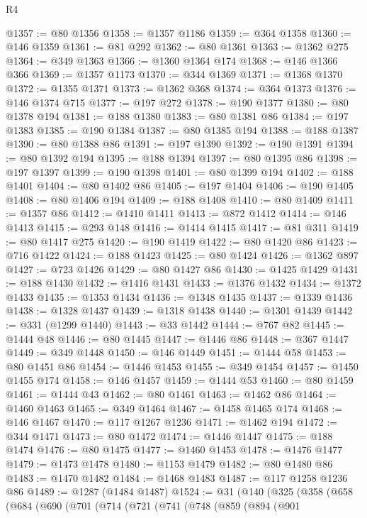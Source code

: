 \begin{lexlean}{R4}
\begin{coremodule}
@1357 := @80 @1356
@1358 := @1357 @1186
@1359 := @364 @1358
@1360 := @146 @1359
@1361 := @81 @292
@1362 := @80 @1361
@1363 := @1362 @275
@1364 := @349 @1363
@1366 := @1360 @1364 @174
@1368 := @146 @1366 @366
@1369 := @1357 @1173
@1370 := @344 @1369
@1371 := @1368 @1370
@1372 := @1355 @1371
@1373 := @1362 @368
@1374 := @364 @1373
@1376 := @146 @1374 @715
@1377 := @197 @272
@1378 := @190 @1377
@1380 := @80 @1378 @194
@1381 := @188 @1380
@1383 := @80 @1381 @86
@1384 := @197 @1383
@1385 := @190 @1384
@1387 := @80 @1385 @194
@1388 := @188 @1387
@1390 := @80 @1388 @86
@1391 := @197 @1390
@1392 := @190 @1391
@1394 := @80 @1392 @194
@1395 := @188 @1394
@1397 := @80 @1395 @86
@1398 := @197 @1397
@1399 := @190 @1398
@1401 := @80 @1399 @194
@1402 := @188 @1401
@1404 := @80 @1402 @86
@1405 := @197 @1404
@1406 := @190 @1405
@1408 := @80 @1406 @194
@1409 := @188 @1408
@1410 := @80 @1409
@1411 := @1357 @86
@1412 := @1410 @1411
@1413 := @872 @1412
@1414 := @146 @1413
@1415 := @293 @148
@1416 := @1414 @1415
@1417 := @81 @311
@1419 := @80 @1417 @275
@1420 := @190 @1419
@1422 := @80 @1420 @86
@1423 := @716 @1422
@1424 := @188 @1423
@1425 := @80 @1424
@1426 := @1362 @897
@1427 := @723 @1426
@1429 := @80 @1427 @86
@1430 := @1425 @1429
@1431 := @188 @1430
@1432 := @1416 @1431
@1433 := @1376 @1432
@1434 := @1372 @1433
@1435 := @1353 @1434
@1436 := @1348 @1435
@1437 := @1339 @1436
@1438 := @1328 @1437
@1439 := @1318 @1438
@1440 := @1301 @1439
@1442 := @331 (@1299 @1440)
@1443 := @33 @1442
@1444 := @767 @82
@1445 := @1444 @48
@1446 := @80 @1445
@1447 := @1446 @86
@1448 := @367 @1447
@1449 := @349 @1448
@1450 := @146 @1449
@1451 := @1444 @58
@1453 := @80 @1451 @86
@1454 := @1446 @1453
@1455 := @349 @1454
@1457 := @1450 @1455 @174
@1458 := @146 @1457
@1459 := @1444 @53
@1460 := @80 @1459
@1461 := @1444 @43
@1462 := @80 @1461
@1463 := @1462 @86
@1464 := @1460 @1463
@1465 := @349 @1464
@1467 := @1458 @1465 @174
@1468 := @146 @1467
@1470 := @117 @1267 @1236
@1471 := @1462 @194
@1472 := @344 @1471
@1473 := @80 @1472
@1474 := @1446 @1447
@1475 := @188 @1474
@1476 := @80 @1475
@1477 := @1460 @1453
@1478 := @1476 @1477
@1479 := @1473 @1478
@1480 := @1153 @1479
@1482 := @80 @1480 @86
@1483 := @1470 @1482
@1484 := @1468 @1483
@1487 := @117 @1258 @1236 @86
@1489 := @1287 (@1484 @1487)
@1524 := @31
    (@140
      (@325
        (@358
          (@658
            (@684
              (@690
                (@701
                  (@714
                    (@721
                      (@741
                        (@748
                          (@859
                            (@894
                              (@901

\end{coremodule}
\end{lexlean}

